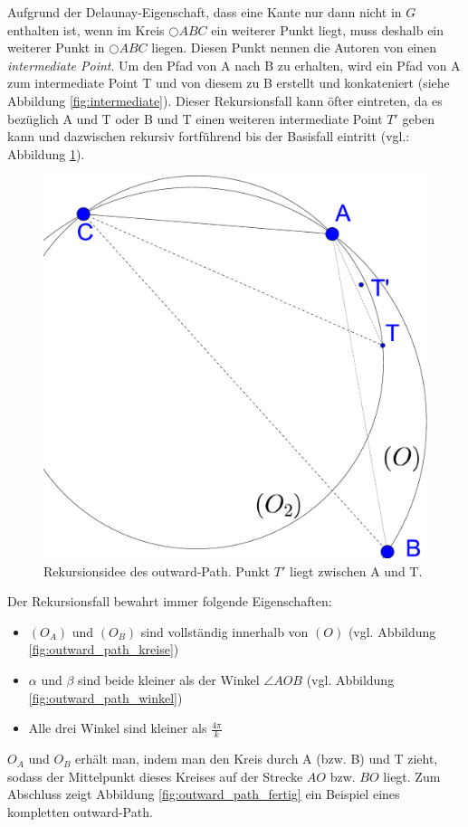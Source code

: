 \documentclass[a4paper,twoside]{IEEEtran}
\begin{document}
Aufgrund der Delaunay-Eigenschaft, dass eine Kante nur dann nicht in $G $ enthalten ist, wenn im Kreis $\bigcirc {ABC} $ ein weiterer Punkt liegt, muss deshalb ein weiterer Punkt in  $\bigcirc {ABC} $ liegen.
Diesen Punkt nennen die Autoren von \cite{kanj} einen \emph{intermediate Point}.
Um den Pfad von A nach B zu erhalten, wird ein Pfad von A zum intermediate Point T und von diesem zu B erstellt und konkateniert (siehe Abbildung \ref{fig:intermediate}).
Dieser Rekursionsfall kann öfter eintreten, da es bezüglich A und T oder B und T einen weiteren intermediate Point $T' $ geben kann und dazwischen rekursiv fortführend bis der Basisfall eintritt (vgl.: Abbildung \ref{fig:rekursion}).
\begin{figure}[h!]
\centering
\includegraphics[width=0.8\linewidth]{rekursion.eps}
\caption{Rekursionsidee des outward-Path. Punkt $T' $ liegt zwischen A und T.}
\label{fig:rekursion}
\end{figure}
Der Rekursionsfall bewahrt immer folgende Eigenschaften:
\begin{itemize}
\item $(O_A) $ und $(O_B) $ sind vollständig innerhalb von $(O) $ (vgl. Abbildung \ref{fig:outward_path_kreise})
\item $\alpha $ und $\beta $ sind beide kleiner als der Winkel $\angle {AOB} $ (vgl. Abbildung \ref{fig:outward_path_winkel}) 
\item Alle drei Winkel sind kleiner als $\frac{4\pi}{k} $
\end{itemize}
$O_A $ und $O_B $ erhält man, indem man den Kreis durch A (bzw. B) und T zieht, sodass der Mittelpunkt dieses Kreises auf der Strecke $AO $ bzw. $BO $ liegt.
Zum Abschluss zeigt Abbildung \ref{fig:outward_path_fertig} ein Beispiel eines kompletten outward-Path.
\end{document}
